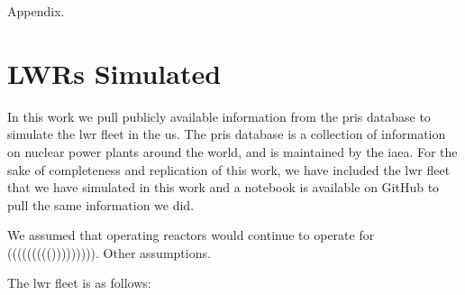 Appendix.

\section{LWRs Simulated}
\label{app:lwrs}

In this work we pull publicly available information from the \gls{pris} database to simulate the \gls{lwr} fleet in the \gls{us}. The \gls{pris} database is a collection of information on nuclear power plants around the world, and is maintained by the \gls{iaea}. For the sake of completeness and replication of this work, we have included the \gls{lwr} fleet that we have simulated in this work and a notebook is available on GitHub to pull the same information we did.

We assumed that operating reactors would continue to operate for ((((((((())))))))). Other assumptions.

The \gls{lwr} fleet is as follows:
